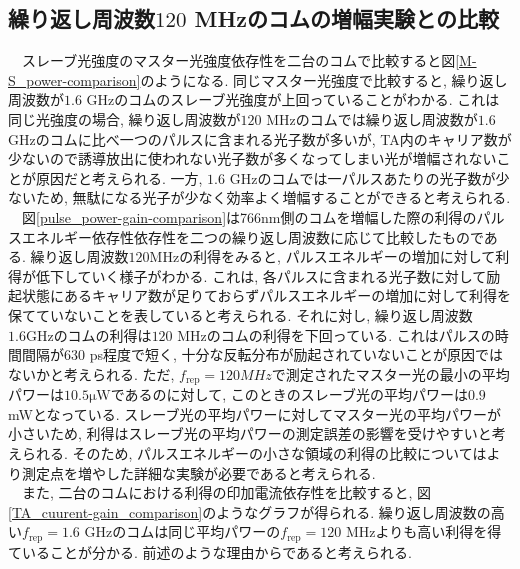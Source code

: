 \documentclass[uplatex, dvipdfmx, a4paper, report, papersize, 11pt]{jsbook}
\begin{document}
\newpage
\subsection{繰り返し周波数$120$ MHzのコムの増幅実験との比較}
　スレーブ光強度のマスター光強度依存性を二台のコムで比較すると図\ref{M-S_power-comparison}のようになる. 同じマスター光強度で比較すると, 繰り返し周波数が$1.6$ GHzのコムのスレーブ光強度が上回っていることがわかる. これは同じ光強度の場合, 繰り返し周波数が$120$ MHzのコムでは繰り返し周波数が$1.6$ GHzのコムに比べ一つのパルスに含まれる光子数が多いが, TA内のキャリア数が少ないので誘導放出に使われない光子数が多くなってしまい光が増幅されないことが原因だと考えられる. 一方, $1.6$ GHzのコムでは一パルスあたりの光子数が少ないため, 無駄になる光子が少なく効率よく増幅することができると考えられる. \\
　図\ref{pulse_power-gain-comparison}は766nm側のコムを増幅した際の利得のパルスエネルギー依存性依存性を二つの繰り返し周波数に応じて比較したものである. 繰り返し周波数$120 \mathrm{MHz}$の利得をみると, パルスエネルギーの増加に対して利得が低下していく様子がわかる. これは, 各パルスに含まれる光子数に対して励起状態にあるキャリア数が足りておらずパルスエネルギーの増加に対して利得を保てていないことを表していると考えられる. それに対し, 繰り返し周波数$1.6 \mathrm{GHz}$のコムの利得は$120$ MHzのコムの利得を下回っている. これはパルスの時間間隔が$630$ ps程度で短く, 十分な反転分布が励起されていないことが原因ではないかと考えられる. ただ, $f_\mathrm{rep} = 120MHz$で測定されたマスター光の最小の平均パワーは$10.5 \mathrm{\mu W}$であるのに対して, このときのスレーブ光の平均パワーは$0.9$ mWとなっている. スレーブ光の平均パワーに対してマスター光の平均パワーが小さいため, 利得はスレーブ光の平均パワーの測定誤差の影響を受けやすいと考えられる. そのため, パルスエネルギーの小さな領域の利得の比較についてはより測定点を増やした詳細な実験が必要であると考えられる. \\
　また, 二台のコムにおける利得の印加電流依存性を比較すると, 図\ref{TA_cuurent-gain_comparison}のようなグラフが得られる. 繰り返し周波数の高い$f_\mathrm{rep} = 1.6$ GHzのコムは同じ平均パワーの$f_\mathrm{rep} = 120$ MHzよりも高い利得を得ていることが分かる. 前述のような理由からであると考えられる.
\end{document}
